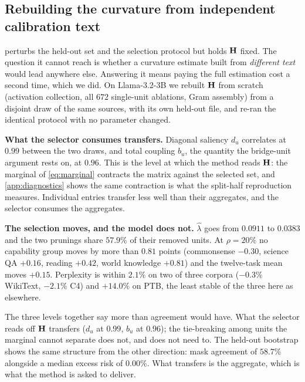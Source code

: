 \subsection{Rebuilding the curvature from independent calibration text}
\label{app:seed-variance}

 perturbs the held-out set and the selection protocol but holds $\mathbf{H}$
fixed. The question it cannot reach is whether a curvature estimate built from \emph{different text}
would lead anywhere else. Answering it means paying the full estimation cost a second time, which we
did. On Llama-3.2-3B we rebuilt $\mathbf{H}$ from scratch (activation collection, all $672$ single-unit
ablations, Gram assembly) from a disjoint draw of the same sources, with its own held-out file, and
re-ran the identical protocol with no parameter changed.

\textbf{What the selector consumes transfers.} Diagonal saliency $d_u$ correlates at $0.99$ between
the two draws, and total coupling $b_u$, the quantity the bridge-unit argument rests on, at $0.96$.
This is the level at which the method reads $\mathbf{H}$: the marginal of \cref{eq:marginal} contracts the
matrix against the selected set, and \cref{app:diagnostics} shows the same contraction is what the
split-half reproduction measures. Individual entries transfer less well than their aggregates, and the
selector consumes the aggregates.

\textbf{The selection moves, and the model does not.} $\hat\lambda$ goes from $0.0911$ to $0.0383$ and
the two prunings share $57.9\%$ of their removed units. At $\rho{=}20\%$ no capability group moves by
more than $0.81$ points (commonsense $-0.30$, science QA $+0.16$, reading $+0.42$, world knowledge
$+0.81$) and the twelve-task mean moves $+0.15$. Perplexity is within $2.1\%$ on two of three corpora
($-0.3\%$ WikiText, $-2.1\%$ C4) and $+14.0\%$ on PTB, the least stable of the three here as
elsewhere.

The three levels together say more than agreement would have. What the selector reads off $\mathbf{H}$
transfers ($d_u$ at $0.99$, $b_u$ at $0.96$); the tie-breaking among units the marginal cannot
separate does not, and does not need to. The held-out
bootstrap shows the same structure from the other direction: mask agreement of $58.7\%$ alongside a
median excess risk of $0.00\%$. What transfers is the aggregate, which is what the method is asked to
deliver.
